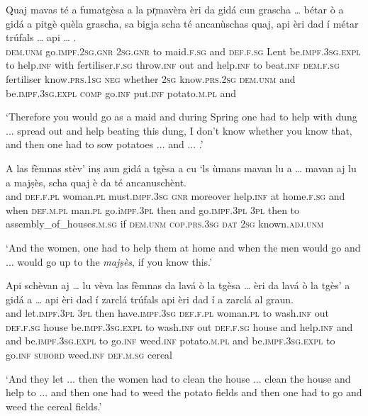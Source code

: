 \begin{linenumbers}
	\gll Quaj mavas té a fumatgèsa a la pr̩mavèra èri da gidá cun grascha … bétar ò a gidá a pitgè quèla grascha, sa bigja scha té ancanùschas quaj, api èri dad í métar trúfals … api … .\\
	\textsc{dem.unm} go.\textsc{impf.2sg.gnr} \textsc{2sg.gnr} to maid.\textsc{f.sg} and \textsc{def.f.sg} Lent be.\textsc{impf.3sg.expl} to help.\textsc{inf} with fertiliser.\textsc{f.sg} {} throw.\textsc{inf} out and help.\textsc{inf} to beat.\textsc{inf} \textsc{dem.f.sg} fertiliser know.\textsc{prs.1sg} \textsc{neg} whether \textsc{2sg} know.\textsc{prs.2sg} \textsc{dem.unm} and be.\textsc{impf.3sg.expl} \textsc{comp} go.\textsc{inf} put.\textsc{inf} potato.\textsc{m.pl} {} and\\
\end{linenumbers}
\medskip
\glt `Therefore you would go as a maid and during Spring one had to help with dung ... spread out and help beating this dung, I don't know whether you know that, and then one had to sow potatoes ... and ... .'
\medskip

\begin{linenumbers}
\gll A las fèmnas stèv’ inṣ aun gidá a tgèsa a cu `ls ùmans mavan lu a … mavan aj lu a majṣès, scha quaj è da té ancanuschènt.\\
and \textsc{def.f.pl} woman.\textsc{pl} must.\textsc{impf.3sg} \textsc{gnr} moreover help.\textsc{inf} at home.\textsc{f.sg} and when \textsc{def.m.pl} man.\textsc{pl} go.i\textsc{mpf.3pl} then and {} go.\textsc{impf.3pl} \textsc{3pl} then to assembly\_of\_houses.\textsc{m.sg} if \textsc{dem.unm} \textsc{cop.prs.3sg} \textsc{dat} \textsc{2sg} known.\textsc{adj.unm}\\
\end{linenumbers}
\medskip
\glt `And the women, one had to help them at home and when the men would go and ... would go up to the \textit{majṣès}, if you know this.'
\medskip


\begin{linenumbers}
	\gll Api schèvan aj … lu vèva las fèmnas da lavá ò la tgèsa … èri da lavá ò la tgès’ a gidá a … api èri dad í zarclá trúfals api èri dad í a zarclá al graun.   \\
	and let.\textsc{impf.3pl} \textsc{3pl} {} then have.\textsc{impf.3sg} \textsc{def.f.pl} woman.\textsc{pl} to wash.\textsc{inf} out \textsc{def.f.sg} house {} be.\textsc{impf.3sg.expl} to wash.\textsc{inf} out \textsc{def.f.sg} house and  help.\textsc{inf} and {} and be.\textsc{impf.3sg.expl} to go.\textsc{inf} weed.\textsc{inf} potato.\textsc{m.pl} and be.\textsc{impf.3sg.expl} to go.\textsc{inf} \textsc{subord} weed.\textsc{inf} \textsc{def.m.sg} cereal\\
\end{linenumbers}
\medskip
\glt `And they let ... then the women had to clean the house ... clean the house and help to ... and then one had to weed the potato fields and then one had to go and weed the cereal fields.'
\medskip


